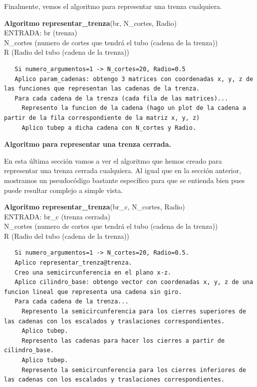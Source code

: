  Finalmente, vemos el algoritmo para representar una trenza cualquiera. 
\begin{alg}
  	\textbf{Algoritmo representar\_trenza}(br, N\_cortes, Radio)\\
  	ENTRADA: br (trenza)\\
  	\hspace*{2.2cm} N\_cortes (numero de cortes que tendrá el tubo (cadena de la trenza))\\
  	\hspace*{2.2cm} R (Radio del tubo (cadena de la trenza))
  	
\begin{lstlisting}
   Si numero_argumentos=1 -> N_cortes=20, Radio=0.5
   Aplico param_cadenas: obtengo 3 matrices con coordenadas x, y, z de las funciones que representan las cadenas de la trenza.
   Para cada cadena de la trenza (cada fila de las matrices)...
     Represento la funcion de la cadena (hago un plot de la cadena a partir de la fila correspondiente de la matriz x, y, z)
     Aplico tubep a dicha cadena con N_cortes y Radio.
\end{lstlisting}
\end{alg}

 \begin{center}
 	\textbf{Algoritmo para representar una trenza cerrada.}
 \end{center} 
 En esta última sección vamos a ver el algoritmo que hemos creado para representar una trenza cerrada cualquiera. Al igual que en la sección anterior, mostramos un pseudocódigo bastante específico para que se entienda bien pues puede resultar complejo a simple vista. 
\begin{alg}
	\textbf{Algoritmo representar\_trenza}(br\_c, N\_cortes, Radio)\\
	ENTRADA: br\_c (trenza cerrada)\\
	\hspace*{2.2cm} N\_cortes (numero de cortes que tendrá el tubo (cadena de la trenza))\\
	\hspace*{2.2cm} R (Radio del tubo (cadena de la trenza))
	
\begin{lstlisting}
   Si numero_argumentos=1 -> N_cortes=20, Radio=0.5.
   Aplico representar_trenza@trenza.
   Creo una semicircunferencia en el plano x-z.
   Aplico cilindro_base: obtengo vector con coordenadas x, y, z de una funcion lineal que representa una cadena sin giro.
   Para cada cadena de la trenza...
     Represento la semicircunferencia para los cierres superiores de las cadenas con los escalados y traslaciones correspondientes.
     Aplico tubep.
     Represento las cadenas para hacer los cierres a partir de cilindro_base.
     Aplico tubep.
     Represento la semicircunferencia para los cierres inferiores de las cadenas con los escalados y traslaciones correspondientes.
\end{lstlisting}
\end{alg}